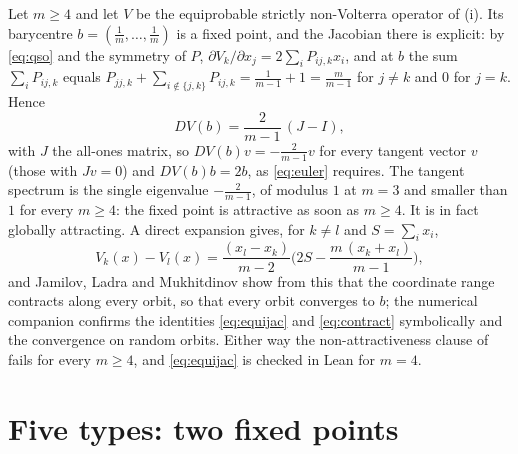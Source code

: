 \documentclass[11pt]{amsart}
\theoremstyle{definition}
\begin{document}
Let $m\ge4$ and let $V$ be the equiprobable strictly non-Volterra operator of (i). Its barycentre $b=(\frac1m,\dots,\frac1m)$ is a fixed point, and the Jacobian there is explicit: by \eqref{eq:qso} and the symmetry of $P$, $\partial V_k/\partial x_j=2\sum_iP_{ij,k}x_i$, and at $b$ the sum $\sum_iP_{ij,k}$ equals $P_{jj,k}+\sum_{i\notin\{j,k\}}P_{ij,k}=\frac1{m-1}+1=\frac{m}{m-1}$ for $j\ne k$ and $0$ for $j=k$. Hence
\begin{equation}\label{eq:equijac}
DV(b)=\frac{2}{m-1}\,(J-I),
\end{equation}
with $J$ the all-ones matrix, so $DV(b)v=-\frac{2}{m-1}v$ for every tangent vector $v$ (those with $Jv=0$) and $DV(b)b=2b$, as \eqref{eq:euler} requires. The tangent spectrum is the single eigenvalue $-\frac2{m-1}$, of modulus $1$ at $m=3$ and smaller than $1$ for every $m\ge4$: the fixed point is attractive as soon as $m\ge4$. It is in fact globally attracting. A direct expansion gives, for $k\ne l$ and $S=\sum_ix_i$,
\begin{equation}\label{eq:contract}
V_k(x)-V_l(x)=\frac{(x_l-x_k)}{m-2}\Big(2S-\frac{m\,(x_k+x_l)}{m-1}\Big),
\end{equation}
and Jamilov, Ladra and Mukhitdinov \cite{JLM17} show from this that the coordinate range contracts along every orbit, so that every orbit converges to $b$; the numerical companion confirms the identities \eqref{eq:equijac} and \eqref{eq:contract} symbolically and the convergence on random orbits. Either way the non-attractiveness clause of  fails for every $m\ge4$, and \eqref{eq:equijac} is checked in Lean for $m=4$.

\section{Five types: two fixed points}\label{sec:five}
\end{document}
